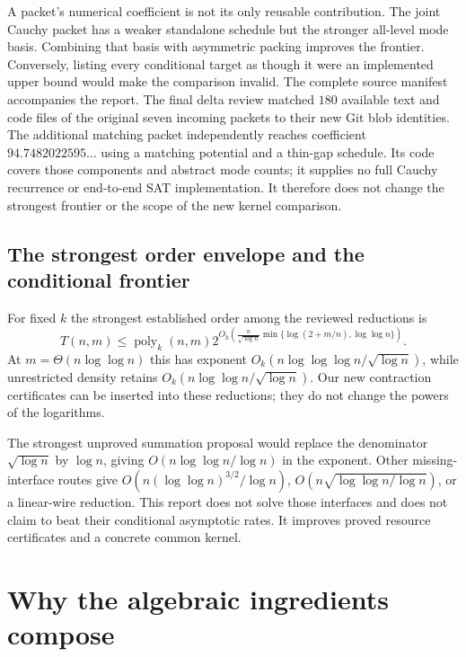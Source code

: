 \documentclass[11pt,letterpaper]{article}
\theoremstyle{definition}\newtheorem{definition}[theorem]{Definition}
\theoremstyle{remark}\newtheorem{remark}[theorem]{Remark}
\newcommand{\poly}{\operatorname{poly}}
\begin{document}
A packet's numerical coefficient is not its only reusable contribution.
The joint Cauchy packet has a weaker standalone schedule but the stronger
all-level mode basis. Combining that basis with asymmetric packing improves
the frontier. Conversely, listing every conditional target as though it
were an implemented upper bound would make the comparison invalid.
The complete source manifest accompanies the report. The final delta review
matched $180$ available text and code files of the original seven incoming
packets to their new Git blob identities. The additional matching packet
independently reaches coefficient $94.7482022595\ldots$ \cite{matching} using a matching
potential and a thin-gap schedule. Its code covers those components and
abstract mode counts; it supplies no full Cauchy recurrence or end-to-end
SAT implementation. It therefore does not change the strongest frontier
or the scope of the new kernel comparison.

\subsection{The strongest order envelope and the conditional frontier}

For fixed $k$ the strongest established order among the reviewed reductions is
\begin{equation}\label{eq:density}
 T(n,m)\le\poly_k(n,m)
 2^{O_k\left(\frac{n}{\sqrt{\log n}}
       \min\{\log(2+m/n),\log\log n\}\right)}.
\end{equation}
At $m=\Theta(n\log\log n)$ this has exponent
$O_k(n\log\log\log n/\sqrt{\log n})$, while unrestricted density retains
$O_k(n\log\log n/\sqrt{\log n})$.
Our new contraction certificates can be inserted into these reductions;
they do not change the powers of the logarithms.

The strongest unproved summation proposal would replace the denominator
$\sqrt{\log n}$ by $\log n$, giving
$O(n\log\log n/\log n)$ in the exponent. Other missing-interface routes
give $O(n(\log\log n)^{3/2}/\log n)$,
$O(n\sqrt{\log\log n/\log n})$, or a linear-wire reduction.
This report does not solve those interfaces and does not claim to beat
their conditional asymptotic rates. It improves proved resource
certificates and a concrete common kernel.

\section{Why the algebraic ingredients compose}
\label{sec:compose}
\end{document}

